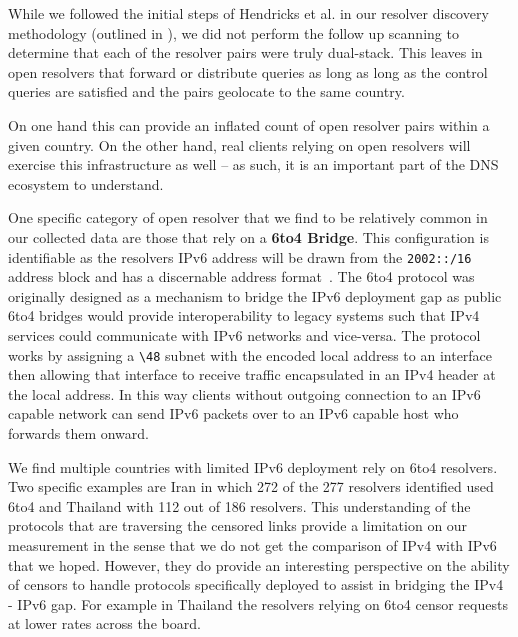 While we followed the initial steps of Hendricks et al. in our resolver discovery
methodology (outlined in ), we did not perform
the follow up scanning to determine that each of the resolver pairs were truly
dual-stack. This leaves in open resolvers that forward or distribute queries as
long as long as the control queries are satisfied and the pairs geolocate to the
same country.

On one hand this can provide an inflated count of open resolver pairs within a
given country. On the other hand, real clients relying on open resolvers will
exercise this infrastructure as well -- as such, it is an important part of the DNS
ecosystem to understand.

One specific category of open resolver that we find to be relatively common
in our collected data are those that rely on a \textbf{6to4 Bridge}. This
configuration is identifiable as the resolvers IPv6 address will be drawn from 
the \texttt{2002::/16} address
block and has a discernable address format~\cite{RFC3056}.
The 6to4 protocol was originally designed as a mechanism to bridge the IPv6
deployment gap as public 6to4 bridges would provide interoperability
to legacy systems such that IPv4 services could communicate with IPv6
networks and vice-versa. The protocol works by assigning a \texttt{\textbackslash 48} subnet
with the encoded local address to an interface then allowing that
interface to receive traffic encapsulated in an IPv4 header at the local address.
In this way clients without outgoing connection to an IPv6 capable network
can send IPv6 packets over to an IPv6 capable host who forwards them onward.

We find multiple countries with limited IPv6 deployment rely on 6to4 resolvers.
Two specific examples are Iran in which 272 of the 277 resolvers identified used
6to4 and Thailand with 112 out of 186 resolvers. This
understanding of the protocols that are traversing the censored links provide
a limitation on our measurement in the sense that we do not get the comparison of
IPv4 with IPv6 that we hoped. However, they do provide an interesting perspective
on the ability of censors to handle protocols specifically deployed to assist in
bridging the IPv4 - IPv6 gap. For example in Thailand the resolvers relying on
6to4 censor requests at lower rates across the board.


